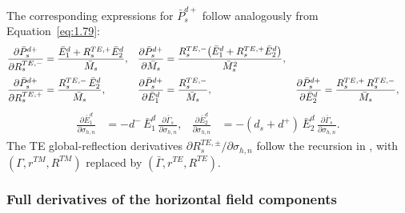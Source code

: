 \documentclass[12pt]{report}
\begin{document}
The corresponding expressions for \(\bar P_s^{d+}\) follow analogously
from Equation~\eqref{eq:1.79}:
\begin{align}
    \frac{\partial\bar{P}_s^{d+}}{\partial R_s^{TE,-}}
    &= \frac{\bar{E}_1^d + R_s^{TE,+}\bar{E}_2^d}{\bar{M}_s}, &
    \frac{\partial\bar{P}_s^{d+}}{\partial\bar{M}_s}
    &= \frac{R_s^{TE,-}\!\left(\bar{E}_1^d + R_s^{TE,+}\bar{E}_2^d\right)}{\bar{M}_s^2},
    \notag \\[2pt]
    \frac{\partial\bar{P}_s^{d+}}{\partial R_s^{TE,+}}
    &= \frac{R_s^{TE,-}\,\bar{E}_2^d}{\bar{M}_s}, &
    \frac{\partial\bar{P}_s^{d+}}{\partial\bar{E}_1^d}
    &= \frac{R_s^{TE,-}}{\bar{M}_s}, &
    \frac{\partial\bar{P}_s^{d+}}{\partial\bar{E}_2^d}
    &= \frac{R_s^{TE,+}\,R_s^{TE,-}}{\bar{M}_s},
    \label{eq:1.92}
\end{align}
\begin{align}
    \frac{\partial\bar{E}_1^d}{\partial\sigma_{h,n}}
    &= -d^-\,\bar{E}_1^d\,\frac{\partial\bar\Gamma_s}{\partial\sigma_{h,n}}, &
    \frac{\partial\bar{E}_2^d}{\partial\sigma_{h,n}}
    &= -(d_s+d^+)\,\bar{E}_2^d\,\frac{\partial\bar\Gamma_s}{\partial\sigma_{h,n}}.
    \label{eq:1.93}
\end{align}
The TE global-reflection derivatives
\(\partial R_s^{TE,\pm}/\partial\sigma_{h,n}\) follow the recursion in
, with
\((\Gamma,r^{TM},R^{TM})\) replaced by
\((\bar\Gamma,r^{TE},R^{TE})\).

\subsubsection{Full derivatives of the horizontal field components}
\label{sec:horizontal_field_derivs}
\end{document}
